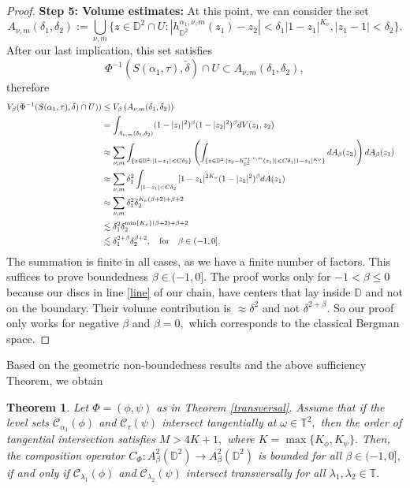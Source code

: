 \documentclass[12pt]{amsart}
\newtheorem{theorem}{Theorem}[section]
\numberwithin{equation}{section}
\begin{document}
\begin{proof}
\textbf{Step 5: Volume estimates:}
At this point, we can consider the set $$A_{\nu,m}(\delta_1,\delta_2):=\bigcup_{\nu,m}\bigg\{z\in\mathbb{D}^2\cap U:|h_{\mathbb{D}^2}^{\alpha_1,\nu,m}(z_1)-z_2|<\delta_1|1-z_1|^{K_\nu}, |z_1-1|<\delta_2\bigg\}.$$
After our last implication, this set satisfies $$\Phi^{-1}(S(\alpha_1,\tau),\tilde{\delta})\cap U\subset  A_{\nu,m}(\delta_1,\delta_2),$$ therefore
\begin{align} V_{\beta}(\Phi^{-1}(S(\alpha_1,\tau),\tilde{\delta})\cap U))&\leq V_{\beta}\left(A_{\nu,m}(\delta_1,\delta_2)\right)\notag&&\\
&=\int_{ A_{\nu,m}(\delta_1,\delta_2)}(1-|z_1|^2)^\beta(1-|z_2|^2)^{\beta}dV(z_1,z_2)\notag&&\\
&\approx \sum_{\nu,m}\int_{\{z\in\mathbb{D}^2:|1-z_1|<C\delta_2\}}\left(\int_{\{z\in\mathbb{D}^2:|z_2-h^{\alpha_1,\nu,m}_{\mathbb{D}^2}(z_1)|<C\delta_1|1-z_1|^{K\nu}\}}dA_{\beta}(z_2)\right)dA_{\beta}(z_1) \label{line}&&\\
&\approx \sum_{\nu,m}\delta_1^{2}\int_{|1-z_1|<C\delta_2}|1-z_1|^{2K_\nu}(1-|z_1|^2)^\beta
dA(z_1)\notag&&\\
&\approx \sum_{\nu,m}\delta_1^{2}\delta_2^{K_{\nu}(\beta+2)+\beta+2}\notag&&\\
&\lesssim \delta_1^{2}\delta_2^{\min\{K_\nu\}(\beta+2)+\beta+2}\notag&&\\
&\lesssim \delta_1^{2+\beta}\delta_2^{\beta+2}, \quad \mathrm{for}\quad \beta\in(-1,0]\notag.
\end{align}
The summation is finite in all cases, as we have a finite number of factors.
This suffices to prove boundedness $\beta\in(-1,0].$ The proof works only for $-1<\beta\leq 0$ because our discs in line \ref{line} of our chain, have centers that lay inside $\mathbb{D}$ and not on the boundary. Their volume contribution is $\approx \delta^2$ and not $\delta^{2+\beta}.$ So our proof only works for negative $\beta$ and $\beta=0,$ which corresponds to the classical Bergman space.
\end{proof}
Based on the geometric non-boundedness results and the above sufficiency Theorem, we obtain

\begin{theorem} Let $\Phi=(\phi,\psi)$ as in Theorem \ref{transversal}. Assume that if the level sets $\mathcal{C}_{\alpha_1}(\phi)$ and $\mathcal{C}_{\tau}(\psi)$ intersect tangentially at $\omega\in\mathbb{T}^2,$ then the order of tangential intersection satisfies $M>4K+1,$ where $K=\max\{K_{\phi},K_{\psi}\}.$  Then, the composition operator $C_{\Phi}:A^2_{\beta}(\mathbb{D}^2)\to A^2_{\beta}(\mathbb{D}^2)$ is bounded for all $\beta\in(-1,0],$ if and only if $\mathcal{C}_{\lambda_1}(\phi)$ and $\mathcal{C}_{\lambda_2}(\psi)$ intersect transversally for all $\lambda_1,\lambda_2\in \mathbb{T}.$
\end{theorem}
\end{document}
